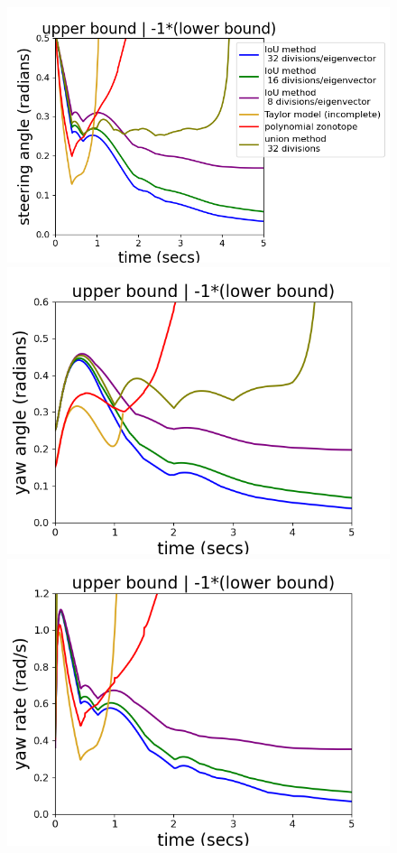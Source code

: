 \begin{figure}
\includegraphics[scale = 0.67]{autocarImages/ubToolSteering.png}
\includegraphics[scale = 0.41]{autocarImages/ubToolYaw.png}\hspace{-2.2em}
\includegraphics[scale = 0.41]{autocarImages/ubToolYawRate.png}

\end{figure}
